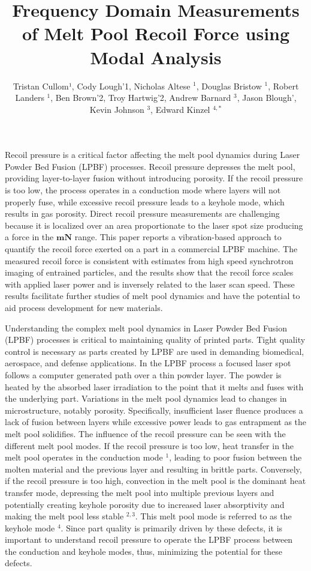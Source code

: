 \documentclass[10pt]{article}
\title{Frequency Domain Measurements of Melt Pool Recoil Force using Modal Analysis }
\author{Tristan Cullom¹, Cody Lough'1, Nicholas Altese ${ }^{1}$, Douglas Bristow ${ }^{1}$, Robert\\
Landers $^{1}$, Ben Brown'2, Troy Hartwig'2, Andrew Barnard ${ }^{3}$, Jason Blough',\\
Kevin Johnson ${ }^{3}$, Edward Kinzel ${ }^{4, *}$}
\date{}
\begin{document}
\maketitle
Recoil pressure is a critical factor affecting the melt pool dynamics during Laser Powder Bed Fusion (LPBF) processes. Recoil pressure depresses the melt pool, providing layer-to-layer fusion without introducing porosity. If the recoil pressure is too low, the process operates in a conduction mode where layers will not properly fuse, while excessive recoil pressure leads to a keyhole mode, which results in gas porosity. Direct recoil pressure measurements are challenging because it is localized over an area proportionate to the laser spot size producing a force in the $\mathbf{m N}$ range. This paper reports a vibration-based approach to quantify the recoil force exerted on a part in a commercial LPBF machine. The measured recoil force is consistent with estimates from high speed synchrotron imaging of entrained particles, and the results show that the recoil force scales with applied laser power and is inversely related to the laser scan speed. These results facilitate further studies of melt pool dynamics and have the potential to aid process development for new materials.

Understanding the complex melt pool dynamics in Laser Powder Bed Fusion (LPBF) processes is critical to maintaining quality of printed parts. Tight quality control is necessary as parts created by LPBF are used in demanding biomedical, aerospace, and defense applications. In the LPBF process a focused laser spot follows a computer generated path over a thin powder layer. The powder is heated by the absorbed laser irradiation to the point that it melts and fuses with the underlying part. Variations in the melt pool dynamics lead to changes in microstructure, notably porosity. Specifically, insufficient laser fluence produces a lack of fusion between layers while excessive power leads to gas entrapment as the melt pool solidifies. The influence of the recoil pressure can be seen with the different melt pool modes. If the recoil pressure is too low, heat transfer in the melt pool operates in the conduction mode ${ }^{1}$, leading to poor fusion between the molten material and the previous layer and resulting in brittle parts. Conversely, if the recoil pressure is too high, convection in the melt pool is the dominant heat transfer mode, depressing the melt pool into multiple previous layers and potentially creating keyhole porosity due to increased laser absorptivity and making the melt pool less stable ${ }^{2,3}$. This melt pool mode is referred to as the keyhole mode ${ }^{4}$. Since part quality is primarily driven by these defects, it is important to understand recoil pressure to operate the LPBF process between the conduction and keyhole modes, thus, minimizing the potential for these defects.
\end{document}
